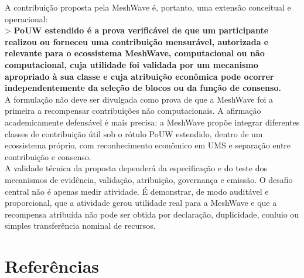 \documentclass[12pt,a4paper]{article}
\begin{document}
A contribuição proposta pela MeshWave é, portanto, uma extensão conceitual e operacional:\\

> \textbf{PoUW estendido é a prova verificável de que um participante realizou ou forneceu uma contribuição mensurável, autorizada e relevante para o ecossistema MeshWave, computacional ou não computacional, cuja utilidade foi validada por um mecanismo apropriado à sua classe e cuja atribuição econômica pode ocorrer independentemente da seleção de blocos ou da função de consenso.}\\

A formulação não deve ser divulgada como prova de que a MeshWave foi a primeira a recompensar contribuições não computacionais. A afirmação academicamente defensável é mais precisa: a MeshWave propõe integrar diferentes classes de contribuição útil sob o rótulo PoUW estendido, dentro de um ecossistema próprio, com reconhecimento econômico em UMS e separação entre contribuição e consenso.\\

A validade técnica da proposta dependerá da especificação e do teste dos mecanismos de evidência, validação, atribuição, governança e emissão. O desafio central não é apenas medir atividade. É demonstrar, de modo auditável e proporcional, que a atividade gerou utilidade real para a MeshWave e que a recompensa atribuída não pode ser obtida por declaração, duplicidade, conluio ou simples transferência nominal de recursos.\\


\section{Referências}
\end{document}
